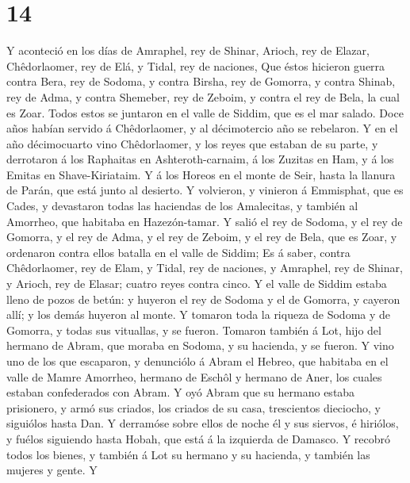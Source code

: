\hypertarget{section-13}{%
\section{14}\label{section-13}}

 Y aconteció en los días de Amraphel, rey de Shinar,
Arioch, rey de Elazar, Chêdorlaomer, rey de Elá, y Tidal, rey de
naciones,  Que éstos hicieron guerra contra Bera, rey de
Sodoma, y contra Birsha, rey de Gomorra, y contra Shinab, rey de Adma, y
contra Shemeber, rey de Zeboim, y contra el rey de Bela, la cual es
Zoar.  Todos estos se juntaron en el valle de Siddim, que
es el mar salado.  Doce años habían servido á
Chêdorlaomer, y al décimotercio año se rebelaron.  Y en el
año décimocuarto vino Chêdorlaomer, y los reyes que estaban de su parte,
y derrotaron á los Raphaitas en Ashteroth-carnaim, á los Zuzitas en Ham,
y á los Emitas en Shave-Kiriataim.  Y á los Horeos en el
monte de Seir, hasta la llanura de Parán, que está junto al desierto.
 Y volvieron, y vinieron á Emmisphat, que es Cades, y
devastaron todas las haciendas de los Amalecitas, y también al Amorrheo,
que habitaba en Hazezón-tamar.  Y salió el rey de Sodoma,
y el rey de Gomorra, y el rey de Adma, y el rey de Zeboim, y el rey de
Bela, que es Zoar, y ordenaron contra ellos batalla en el valle de
Siddim;  Es á saber, contra Chêdorlaomer, rey de Elam, y
Tidal, rey de naciones, y Amraphel, rey de Shinar, y Arioch, rey de
Elasar; cuatro reyes contra cinco.  Y el valle de Siddim
estaba lleno de pozos de betún: y huyeron el rey de Sodoma y el de
Gomorra, y cayeron allí; y los demás huyeron al monte.  Y
tomaron toda la riqueza de Sodoma y de Gomorra, y todas sus vituallas, y
se fueron.  Tomaron también á Lot, hijo del hermano de
Abram, que moraba en Sodoma, y su hacienda, y se fueron. 
Y vino uno de los que escaparon, y denunciólo á Abram el Hebreo, que
habitaba en el valle de Mamre Amorrheo, hermano de Eschôl y hermano de
Aner, los cuales estaban confederados con Abram.  Y oyó
Abram que su hermano estaba prisionero, y armó sus criados, los criados
de su casa, trescientos dieciocho, y siguiólos hasta Dan.
 Y derramóse sobre ellos de noche él y sus siervos, é
hiriólos, y fuélos siguiendo hasta Hobah, que está á la izquierda de
Damasco.  Y recobró todos los bienes, y también á Lot su
hermano y su hacienda, y también las mujeres y gente.  Y

